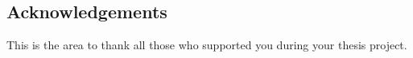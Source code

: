 \pagestyle{plain}
\begin{center}


\section*{Acknowledgements}


\end{center}

This is the area to thank all those who supported you during your thesis project.

\cleardoublepage
